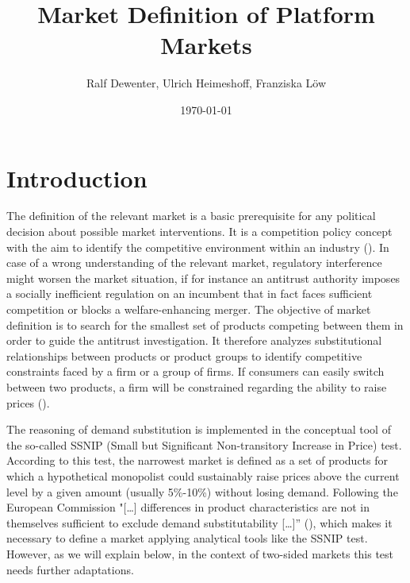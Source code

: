 \documentclass[12pt,a4paper]{scrreprt}
\begin{document}
\title{Market Definition of Platform Markets}
\date{\today}
\author{Ralf Dewenter, Ulrich Heimeshoff, Franziska Löw}

\maketitle

\chapter{Introduction}
The definition of the relevant market is a basic prerequisite for any political decision about possible market interventions. It is a competition policy concept with the aim to identify the competitive environment within an industry (\cite{argentesi_market_2005}). In case of a wrong understanding of the relevant market, regulatory interference might worsen the market situation, if for instance an antitrust authority imposes a socially inefficient regulation on an incumbent that in fact faces sufficient competition or blocks a welfare-enhancing merger. The objective of market definition is to search for the smallest set of products competing between them in order to guide the antitrust investigation. It therefore analyzes substitutional relationships between products or product groups to identify competitive constraints faced by a firm or a group of firms. If consumers can easily switch between two products, a firm will be constrained regarding the ability to raise prices (\cite{filistrucchi_market_2013}).

The reasoning of demand substitution is implemented in the conceptual tool of the so-called SSNIP (Small but Significant Non-transitory Increase in Price) test. According to this test, the narrowest market is defined as a set of products for which a hypothetical monopolist could sustainably raise prices above the current level by a given amount (usually 5\%-10\%) without losing demand. Following the European Commission "[…] differences in product characteristics are not in themselves sufficient to exclude demand substitutability […]” (\cite{european_commission_commission_1997}), which makes it necessary to define a market applying analytical tools like the SSNIP test. However, as we will explain below, in the context of two-sided markets this test needs further adaptations.
\end{document}
